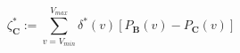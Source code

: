 \begin{equation}
 \zeta^*_\textbf{C} := \sum_{v = V_{min}}^{V_{max}} \delta^{*}(v) \left[P_\textbf{B}(v) - P_\textbf{C}(v)\right]
 \label{ch1:equ:voltage-metric}
\end{equation}
